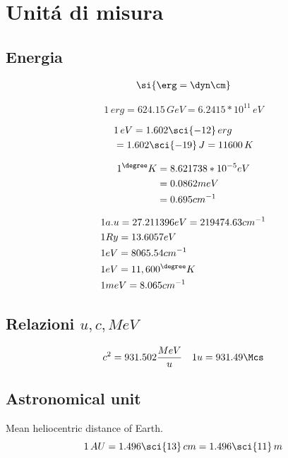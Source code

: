 \section{Unit\'a di misura}

\subsection{Energia}

\begin{align*}
\si{\erg=\dyn\cm}
\end{align*}

\begin{equation*}
1\,erg = 624.15\,GeV = 6.2415*10^{11}\, eV
\end{equation*}

\begin{align*}
&1\,eV=1.602\sci{-12}\,erg\\
&=1.602\sci{-19}\,J=11600\,K\\
\end{align*}

\begin{align*}
1  ^{\degree}K&= 8.621738*10^{-5}  eV \\
&= 0.0862 meV \\
&= 0.695 cm^{-1}
\end{align*}

\begin{align*}
&1 a.u=27.211396 eV=219474.63 cm^{-1}\\
&1 Ry=13.6057 eV \\
&1 eV =8065.54 cm^{-1} \\
&1 eV= 11,600  ^{\degree}K\\
&1 meV = 8.065 cm^{-1}
\end{align*}

\subsection{Relazioni $u,c,MeV$}
 
\begin{align*}
&c^2=931.502\frac{MeV}{u}
&1 u=931.49 \Mcs
\end{align*}
 

\subsection{Astronomical unit}

Mean heliocentric distance of Earth.
\begin{equation*}
1\,AU=1.496\sci{13}\,cm=1.496\sci{11}\,m
\end{equation*}

